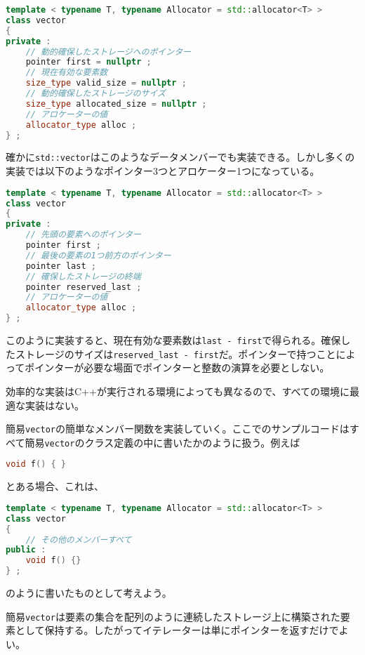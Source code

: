 \begin{lstlisting}[language={C++}]
template < typename T, typename Allocator = std::allocator<T> >
class vector
{
private :
    // 動的確保したストレージへのポインター
    pointer first = nullptr ;
    // 現在有効な要素数
    size_type valid_size = nullptr ;
    // 動的確保したストレージのサイズ
    size_type allocated_size = nullptr ;
    // アロケーターの値
    allocator_type alloc ;
} ;
\end{lstlisting}

確かに\texttt{std::vector}はこのようなデータメンバーでも実装できる。しかし多くの実装では以下のようなポインター3つとアロケーター1つになっている。

\begin{lstlisting}[language={C++}]
template < typename T, typename Allocator = std::allocator<T> >
class vector
{
private :
    // 先頭の要素へのポインター
    pointer first ;
    // 最後の要素の1つ前方のポインター
    pointer last ;
    // 確保したストレージの終端
    pointer reserved_last ;
    // アロケーターの値
    allocator_type alloc ;
} ;
\end{lstlisting}

このように実装すると、現在有効な要素数は\texttt{last - first}で得られる。確保したストレージのサイズは\texttt{reserved\_last - first}だ。ポインターで持つことによってポインターが必要な場面でポインターと整数の演算を必要としない。

効率的な実装はC++が実行される環境によっても異なるので、すべての環境に最適な実装はない。

\clearpage
{}

簡易\texttt{vector}の簡単なメンバー関数を実装していく。ここでのサンプルコードはすべて簡易\texttt{vector}のクラス定義の中に書いたかのように扱う。例えば
\begin{lstlisting}[language={C++}]
void f() { }
\end{lstlisting}
とある場合、これは、
\begin{lstlisting}[language={C++}]
template < typename T, typename Allocator = std::allocator<T> >
class vector
{
    // その他のメンバーすべて
public :
    void f() {}
} ;
\end{lstlisting}
のように書いたものとして考えよう。


簡易\texttt{vector}は要素の集合を配列のように連続したストレージ上に構築された要素として保持する。したがってイテレーターは単にポインターを返すだけでよい。

